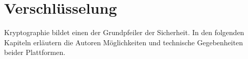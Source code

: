 \section{Verschlüsselung}
	Kryptographie bildet einen der Grundpfeiler der Sicherheit. In den folgenden
	Kapiteln erläutern die Autoren Möglichkeiten und technische Gegebenheiten
	beider Plattformen. 
